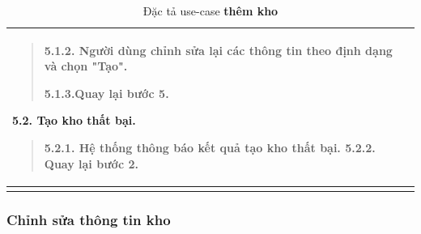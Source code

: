 \begin{longtable}{| p{} | p{} |}
\begin{quote}
                    5.1.2. Người dùng chỉnh sửa lại các thông tin theo định dạng và chọn "Tạo".
                    
                    5.1.3.Quay lại bước 5.
                    \end{quote}
                5.2. Tạo kho thất bại.
                    \begin{quote}
                    5.2.1. Hệ thống thông báo kết quả tạo kho thất bại.
                    5.2.2. Quay lại bước 2.
                    \end{quote}
                \\
                \hline
                \caption{Đặc tả use-case \textbf{thêm kho}}
            \end{longtable}
    
        \subsubsection{Chỉnh sửa thông tin kho}
